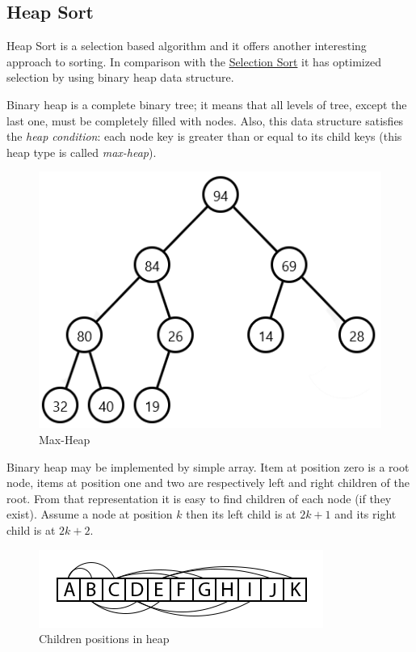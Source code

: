 \documentclass[
  field=inf,
  biblatex,
  language=english,
  glossaries,
  theorems=false,
  sourcecodes=false,
  index
]{kidiplom}
\begin{document}
\subsection{Heap Sort}

Heap Sort is a selection based algorithm and it offers another interesting approach to sorting. In comparison with the \hyperref[sec:selection]{Selection Sort} it has optimized selection by using binary heap data structure.

Binary heap is a complete binary tree; it means that all levels of tree, except the last one, must be completely filled with nodes. Also, this data structure satisfies the \textit{heap condition}: each node key is greater than or equal to its child keys (this heap type is called \textit{max-heap}).

\begin{figure}[H]
\begin{center}
	
	\includegraphics[scale=0.7]{img/Maxheap.png}
	\caption{Max-Heap}\label{fig:maxheap}
\end{center}
\end{figure}

Binary heap may be implemented by simple array. Item at position zero is a root node, items at position one and two are respectively left and right children of the root. From that representation it is easy to find children of each node (if they exist). Assume a node at position $k$ then its left child is at $2k + 1$ and its right child is at $2k + 2$.

\begin{figure}[H]
\begin{center}
	
	\includegraphics[scale=3]{img/Heapsort.png}
	\caption{Children positions in heap}\label{fig:heapsort}
\end{center}
\end{figure}
\end{document}

